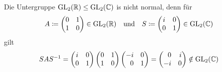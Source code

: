 \subsection{}

Die Untergruppe $\operatorname{GL}_{2}(\mathbb{R}) \leq \operatorname{GL}_{2}(\mathbb{C})$ is nicht normal, denn für
\[
            A
  \coloneqq \begin{pmatrix}
              0 & 1 \\
              1 & 0
            \end{pmatrix}
  \in       \operatorname{GL}_{2}(\mathbb{R})
  \quad\text{und}\quad
            S
  \coloneqq \begin{pmatrix}
              i & 0 \\
              0 & 1
            \end{pmatrix}
  \in       \operatorname{GL}_{2}(\mathbb{C})
\]
gilt
\[
    S A S^{-1}
  = \begin{pmatrix}
      i & 0 \\
      0 & 1
    \end{pmatrix}
    \begin{pmatrix}
      0 & 1 \\
      1 & 0
    \end{pmatrix}
    \begin{pmatrix*}[r]
      -i  & 0 \\
       0  & 1
    \end{pmatrix*}
  = \begin{pmatrix*}[r]
       0  & i \\
      -i  & 0
    \end{pmatrix*}
  \notin \GL{2}{\Complex}
\]
